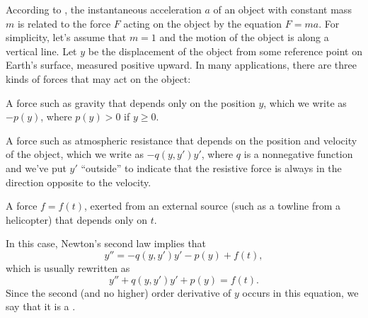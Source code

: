 
According to
,  the
instantaneous acceleration
$a$ of an object with constant mass $m$ is related to the force $F$
acting on the object by the equation $F=ma$. For simplicity, let's
assume that $m=1$ and the motion of the object is along a vertical
line. Let $y$ be the displacement of the object from some reference
point on Earth's surface, measured positive upward. In many
applications, there are three kinds of forces that may act on the
object:

\begin{alist}
\item %
A force such as gravity that depends only on the position $y$,
which we write as $-p(y)$, where $p(y)>0$ if $y\ge0$.

\item %
A force such as atmospheric resistance that depends on
the position and velocity of the object, which we write as
$-q(y,y')y'$, where $q$ is a nonnegative function and we've
put $y'$ ``outside'' to indicate that the resistive force is
always in the direction opposite to the velocity.
\item %
A force $f=f(t)$, exerted from an external source (such as a towline
from a helicopter) that depends only on $t$.
\end{alist}

In this case, Newton's second law implies that
\[
y''=-q(y,y')y'-p(y)+f(t),
\]
which is usually rewritten as
\[
y''+q(y,y')y'+p(y)=f(t).
\]
Since the  second (and no higher) order derivative of $y$ occurs in
this equation, we say that it is a .


